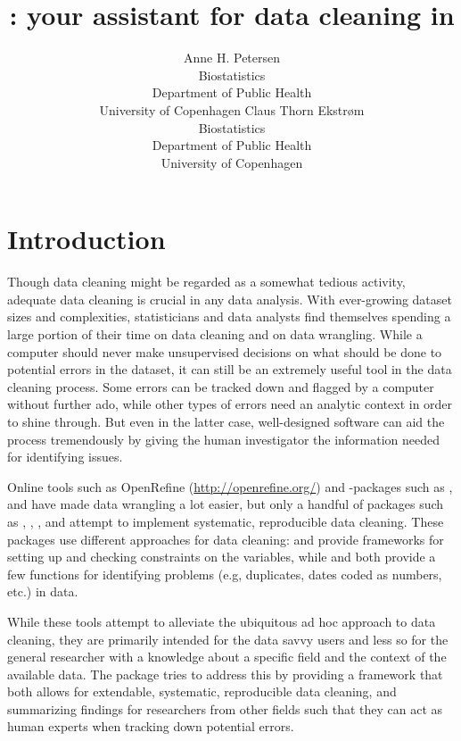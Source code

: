 \documentclass[article,shortnames]{jss}
\author{Anne H. Petersen\\Biostatistics\\Department of Public
  Health\\University of Copenhagen \And Claus Thorn Ekstr\o m\\Biostatistics\\Department of Public
  Health\\University of Copenhagen}
\title{\pkg{dataMaid}: your assistant for data cleaning in \proglang{R}}
\begin{document}
\section{Introduction}
Though data cleaning might be regarded as a somewhat tedious activity,
adequate data cleaning is crucial in any data analysis. With
ever-growing dataset sizes and complexities, statisticians and data
analysts find themselves spending a large portion of their time on
data cleaning and on data wrangling. While a computer should never
make unsupervised decisions on what should be done to potential
errors in the dataset, it can still be an extremely useful tool in the 
data cleaning process. Some errors can be tracked down and flagged by a 
computer without further ado, while other types of errors need an analytic
context in order to shine through. But even in the latter case, well-designed
software can aid the process tremendously by giving the human investigator the 
information needed for identifying issues. 

Online tools such as OpenRefine (\url{http://openrefine.org/}) and
-packages such as , and  have
made data wrangling a lot easier, but only a handful of packages such
as , , , and
 attempt to implement systematic, reproducible data
cleaning.  These packages use different approaches for data cleaning:
 and  provide frameworks for setting up
and checking constraints on the variables, while  and
 both provide a few functions for identifying problems
(e.g, duplicates, dates coded as numbers, etc.) in data.

While these tools attempt to alleviate the ubiquitous ad hoc approach
to data cleaning, they are primarily intended for the data savvy users
and less so for the general researcher with a knowledge about a specific
field and the context of the available data. The  package
tries to address this by providing a framework that both allows for
extendable, systematic, reproducible data cleaning, and summarizing
findings for researchers from other fields such that they can act as
human experts when tracking down potential errors. 

\end{document}
